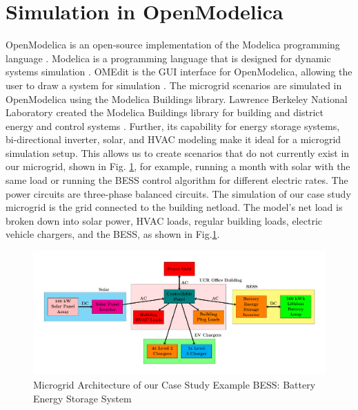 \documentclass[conference, usletter]{IEEEtran}
\begin{document}
 \section{Simulation in OpenModelica}
 OpenModelica is an open-source implementation of the Modelica programming language \cite{OpenModelica}. Modelica is a programming language that is designed for dynamic systems simulation \cite{ModelicaLanguage}. OMEdit is the GUI interface for OpenModelica, allowing the user to draw a system for simulation \cite{OMEdit}. The microgrid scenarios are simulated in OpenModelica using the Modelica Buildings library. Lawrence Berkeley National Laboratory created the Modelica Buildings library for building and district energy and control systems \cite{ModelicaBuildingsLibrary}.
 Further, its capability for energy storage systems, bi-directional inverter, solar, and HVAC modeling make it ideal for a microgrid simulation setup. This allows us to create scenarios that do not currently exist in our microgrid, shown in Fig. \ref{fig:powersystemsetupfull}, for example, running a month with solar with the same load or running the BESS control algorithm for different electric rates. The power circuits are three-phase balanced circuits. The simulation of our case study microgrid is the grid connected to the building netload. The model's net load is broken down into solar power, HVAC loads, regular building loads, electric vehicle chargers, and the BESS, as shown in Fig.\ref{fig:powersystemsetupfull}.
 \begin{figure}
 	\centering
 	\includegraphics[width=\linewidth]{Fig/power_system_setup_modelica_large}
 	\caption{\footnotesize Microgrid Architecture of our Case Study Example BESS: Battery Energy Storage System}
 	\label{fig:powersystemsetupfull}
 \end{figure}
\end{document}
